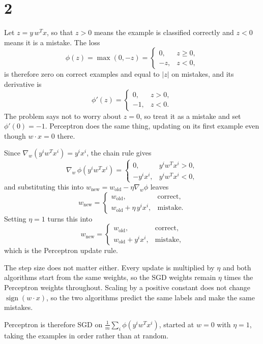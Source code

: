 \documentclass[11pt]{article}
\begin{document}
\section*{2}

Let \(z=y\,w^Tx\), so that \(z>0\) means the example is classified correctly
and \(z<0\) means it is a mistake. The loss
\[
\phi(z)=\max(0,-z)
=
\begin{cases}
0, & z\ge0,\\
-z, & z<0,
\end{cases}
\]
is therefore zero on correct examples and equal to \(|z|\) on mistakes, and
its derivative is
\[
\phi'(z)
=
\begin{cases}
0, & z>0,\\
-1, & z<0.
\end{cases}
\]
The problem says not to worry about \(z=0\), so treat it as a mistake and set
\(\phi'(0)=-1\). Perceptron does the same thing, updating on its first
example even though \(w\cdot x=0\) there.

Since \(\nabla_w(y^iw^Tx^i)=y^ix^i\), the chain rule gives
\[
\nabla_w\,\phi(y^iw^Tx^i)
=
\begin{cases}
0, & y^iw^Tx^i>0,\\
-y^ix^i, & y^iw^Tx^i<0,
\end{cases}
\]
and substituting this into \(w_{\mathrm{new}}=w_{\mathrm{old}}-\eta\nabla_w\phi\)
leaves
\[
w_{\mathrm{new}}
=
\begin{cases}
w_{\mathrm{old}}, & \text{correct},\\
w_{\mathrm{old}}+\eta\,y^ix^i, & \text{mistake}.
\end{cases}
\]
Setting \(\eta=1\) turns this into
\[
\boxed{
w_{\mathrm{new}}
=
\begin{cases}
w_{\mathrm{old}}, & \text{correct},\\
w_{\mathrm{old}}+y^ix^i, & \text{mistake},
\end{cases}
}
\]
which is the Perceptron update rule.

The step size does not matter either. Every update is multiplied by \(\eta\)
and both algorithms start from the same weights, so the SGD weights remain
\(\eta\) times the Perceptron weights throughout. Scaling by a positive
constant does not change \(\operatorname{sign}(w\cdot x)\), so the two
algorithms predict the same labels and make the same mistakes.

Perceptron is therefore SGD on \(\frac1m\sum_i\phi(y^iw^Tx^i)\), started at
\(w=0\) with \(\eta=1\), taking the examples in order rather than at random.
\end{document}
